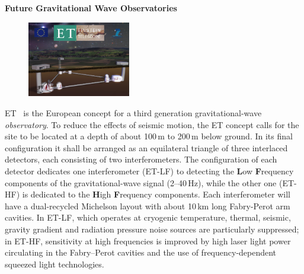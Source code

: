 \begin{DetBox}{\bf Future Gravitational Wave Observatories}
\label{Box:GWOs}
\begin{tcolorbox}[standard jigsaw,colback=amber!10!white,colframe=red!70!black,coltext=black,size=small,  title=The Einstein gravitational--wave Telescope (ET)] 
\begin{figure}
\vspace{-10pt}
\includegraphics*[width=0.4\textwidth]{Figures/ET_Thumb.png}
\label{fig:ET_Thumb}
\vspace{-25pt}
\end{figure}
ET~\cite{ET2011} is the European concept for a third generation gravitational-wave \emph{observatory}. To reduce the effects of seismic motion, the ET concept calls for the site to be located at a depth of about 100\,m to 200\,m below ground. In its final configuration it shall be arranged as an equilateral triangle of three interlaced detectors, each consisting of two interferometers. The configuration of each detector dedicates one interferometer (ET-LF) to detecting the \textbf{L}ow \textbf{F}requency components of the gravitational-wave signal (2--40\,Hz), while the other one (ET-HF) is dedicated to the \textbf{H}igh \textbf{F}requency components. Each interferometer will have a dual-recycled Michelson layout with about 10\,km long Fabry-Perot arm cavities. In ET-LF, which operates at cryogenic temperature, thermal, seismic, gravity gradient and radiation pressure noise sources are particularly suppressed; in ET-HF, sensitivity at high frequencies is improved by high laser light power circulating in the Fabry--Perot cavities and the use of frequency-dependent squeezed light technologies.
\end{tcolorbox}



\end{DetBox}
